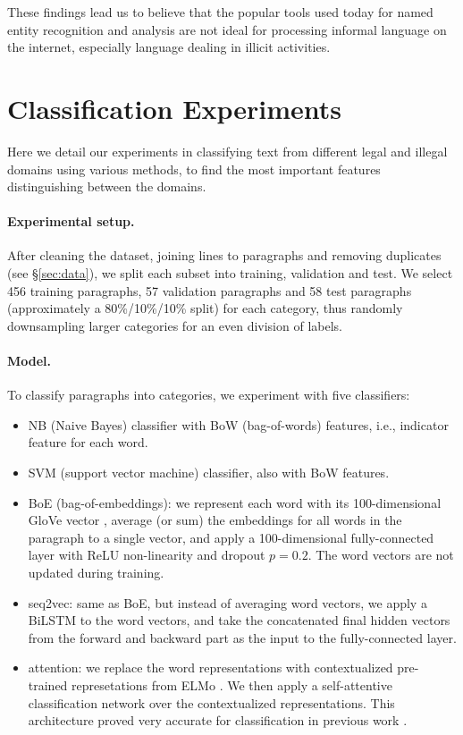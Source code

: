 \documentclass[11pt,a4paper,table]{article}
\begin{document}
These findings lead us to believe that the popular tools used today
for named entity recognition and analysis are not ideal for processing
informal language on the internet, especially language dealing in
illicit activities. 

\section{Classification Experiments}

Here we detail our experiments in classifying text from different legal and
illegal domains using various methods, to find the most important features
distinguishing between the domains.

\paragraph{Experimental setup.}

After cleaning the dataset, joining lines to paragraphs and removing duplicates
(see \S\ref{sec:data}), we split each subset into training, validation and test.
We select 456 training paragraphs, 57 validation paragraphs and
58 test paragraphs (approximately a 80\%/10\%/10\% split) for each category,
thus randomly downsampling larger categories for an even division of labels.

\paragraph{Model.}

To classify paragraphs into categories, we experiment with five classifiers:

\begin{itemize}
  \item NB (Naive Bayes) classifier
  with BoW (bag-of-words) features, i.e., indicator feature for each word.
  \item SVM (support vector machine) classifier,
  also with BoW features.
  \item BoE (bag-of-embeddings): we represent each word with its 100-dimensional
  GloVe vector \cite{pennington2014glove}, average (or sum) the embeddings for all words in the paragraph
  to a single vector, and apply a 100-dimensional fully-connected layer with
  ReLU non-linearity and dropout $p=0.2$.
  The word vectors are not updated during training.
  \item seq2vec: same as BoE, but instead of averaging word vectors,
  we apply a BiLSTM to the word vectors, and take the concatenated
  final hidden vectors from the forward and backward part as the input to the
  fully-connected layer.
  \item attention: we replace the word representations with contextualized
  pre-trained represetations from ELMo \cite{Peters:2018}. We then apply a self-attentive
  classification network \cite{mccann2017learned} over the contextualized representations. This architecture proved very accurate for classification in
  previous work \cite{W18-5427,D18-1401}.
\end{itemize}
\end{document}
